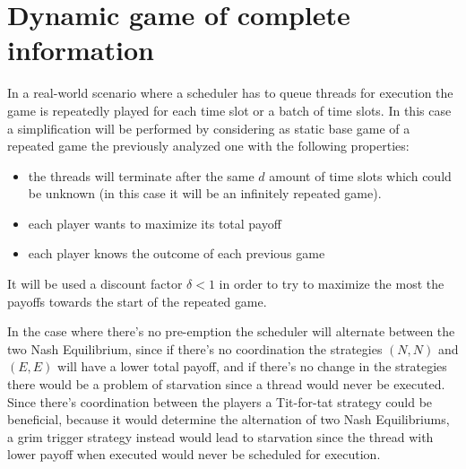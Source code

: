 \section{Dynamic game of complete information}

In a real-world scenario where a scheduler has to queue threads for execution
the game is repeatedly played for each time slot or a batch of time slots.
In this case a simplification will be performed by considering as static base
game of a repeated game the previously analyzed one with the following properties:

\begin{itemize}
    \item the threads will terminate after the same $d$ amount of time slots
    which could be unknown (in this case it will be an infinitely repeated game).
    \item each player wants to maximize its total payoff
    \item each player knows the outcome of each previous game
\end{itemize}

It will be used a discount factor $\delta < 1$ in order to try to maximize
the most the payoffs towards the start of the repeated game.

In the case where there's no pre-emption the scheduler will alternate
between the two Nash Equilibrium, since if there's no coordination
the strategies $(N, N)$ and $(E, E)$ will have a lower total
payoff, and if there's no change in the strategies there would be a problem
of starvation since a thread would never be executed.
Since there's coordination between the players a Tit-for-tat strategy could be
beneficial, because it would determine the alternation of two Nash Equilibriums,
a grim trigger strategy instead would lead to starvation since the thread with
lower payoff when executed would never be scheduled for execution.